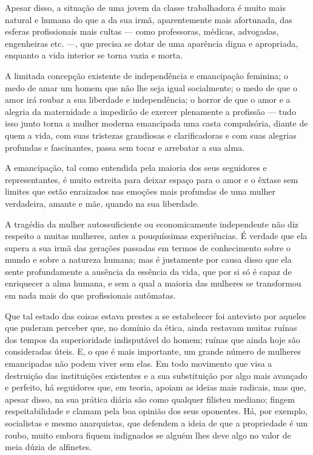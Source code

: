 Apesar disso, a situação de uma jovem da classe trabalhadora é muito
mais natural e humana do que a da sua irmã, aparentemente mais
afortunada, das esferas profissionais mais cultas --- como professoras, médicas, advogadas, engenheiras etc. ---,
que precisa se dotar de uma aparência digna e apropriada, enquanto a
vida interior se torna vazia e morta.

A limitada concepção existente de independência e emancipação feminina;
o medo de amar um homem que não lhe seja igual socialmente; o medo de
que o amor irá roubar a sua liberdade e independência; o horror de que o
amor e a alegria da maternidade a impedirão de exercer plenamente a
profissão --- tudo isso junto torna a mulher moderna emancipada uma casta
compulsória, diante de quem a vida, com suas tristezas grandiosas e
clarificadoras e com suas alegrias profundas e fascinantes, passa sem
tocar e arrebatar a sua alma.

A emancipação, tal como entendida pela maioria dos seus seguidores e
representantes, é muito estreita para deixar espaço para o amor e o
êxtase sem limites que estão enraizados nas emoções mais profundas de\label{extase}
uma mulher verdadeira, amante e mãe, quando na sua liberdade.

A tragédia da mulher autossuficiente ou economicamente independente não
diz respeito a muitas mulheres, antes a pouquíssimas experiências. É
verdade que ela supera a sua irmã das gerações passadas em termos de
conhecimento sobre o mundo e sobre a natureza humana; mas é justamente
por causa disso que ela sente profundamente a ausência da essência da
vida, que por si só é capaz de enriquecer a alma humana, e sem a qual a
maioria das mulheres se transformou em nada mais do que profissionais
autômatas.

Que tal estado das coisas estava prestes a se estabelecer foi antevisto
por aqueles que puderam perceber que, no domínio da ética, ainda
restavam muitas ruínas dos tempos da superioridade indisputável do
homem; ruínas que ainda hoje são consideradas úteis. E, o que é mais
importante, um grande número de mulheres emancipadas não podem viver sem
elas. Em todo movimento que visa a destruição das instituições
existentes e a sua substituição por algo mais avançado e perfeito, há
seguidores que, em teoria, apoiam as ideias mais radicais, mas que,
apesar disso, na sua prática diária são como qualquer filisteu mediano;
fingem respeitabilidade e clamam pela boa opinião dos seus oponentes.
Há, por exemplo, socialistas e mesmo anarquistas, que defendem a ideia
de que a propriedade é um roubo, muito embora fiquem indignados se
alguém lhes deve algo no valor de meia dúzia de alfinetes.\label{alfinete}

